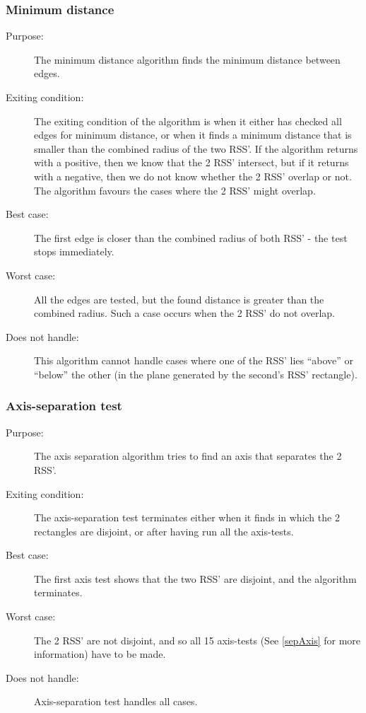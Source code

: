 \subsubsection{Minimum distance}
\begin{description}
\item[Purpose:] The minimum distance algorithm finds the minimum distance between edges.
\item[Exiting condition:]The exiting condition of the algorithm is when it either has checked all edges for minimum distance, or when it finds a minimum distance that is smaller than the combined radius of the two RSS'. If the algorithm returns with a positive, then we know that the 2 RSS' intersect, but if it returns with a negative, then we do not know whether the 2 RSS' overlap or not. The algorithm favours the cases where the 2 RSS' might overlap.
\item[Best case:] The first edge is closer than the combined radius of both RSS' - the test stops immediately.
\item[Worst case:] All the edges are tested, but the found distance is greater than the combined radius. Such a case occurs when the 2 RSS' do not overlap.
\item[Does not handle:] This algorithm cannot handle cases where one of the RSS' lies ``above'' or ``below'' the other (in the plane generated by the second's RSS' rectangle).
\end{description}

\subsubsection{Axis-separation test}
\begin{description}
\item[Purpose:] The axis separation algorithm tries to find an axis that separates the 2 RSS'. 
\item[Exiting condition:] The axis-separation test terminates either when it finds in which the 2 rectangles are disjoint, or after having run all the axis-tests.
\item[Best case:] The first axis test shows that the two RSS' are disjoint, and the algorithm terminates. 
\item[Worst case:] The 2 RSS' are not disjoint, and so all 15 axis-tests (See \ref{sepAxis} for more information) have to be made.
\item[Does not handle:] Axis-separation test handles all cases.
\end{description}

